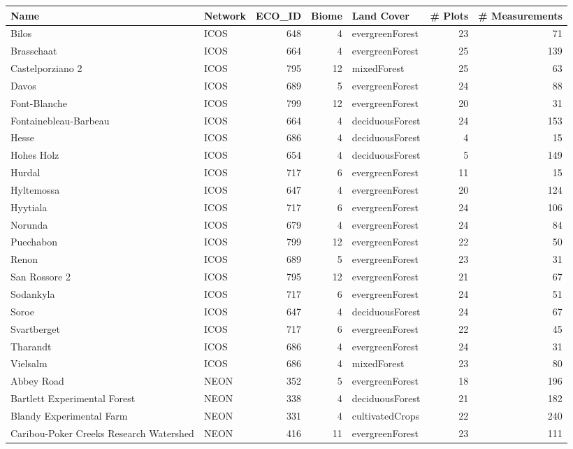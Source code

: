 \begin{tabular}{llrrlrr}
\toprule
Name & Network & ECO_ID & Biome & Land Cover & # Plots & # Measurements \\
\midrule
Bilos & ICOS & 648 & 4 & evergreenForest & 23 & 71 \\
Brasschaat & ICOS & 664 & 4 & evergreenForest & 25 & 139 \\
Castelporziano 2 & ICOS & 795 & 12 & mixedForest & 25 & 63 \\
Davos & ICOS & 689 & 5 & evergreenForest & 24 & 88 \\
Font-Blanche & ICOS & 799 & 12 & evergreenForest & 20 & 31 \\
Fontainebleau-Barbeau & ICOS & 664 & 4 & deciduousForest & 24 & 153 \\
Hesse & ICOS & 686 & 4 & deciduousForest & 4 & 15 \\
Hohes Holz & ICOS & 654 & 4 & deciduousForest & 5 & 149 \\
Hurdal & ICOS & 717 & 6 & evergreenForest & 11 & 15 \\
Hyltemossa & ICOS & 647 & 4 & evergreenForest & 20 & 124 \\
Hyytiala & ICOS & 717 & 6 & evergreenForest & 24 & 106 \\
Norunda & ICOS & 679 & 4 & evergreenForest & 24 & 84 \\
Puechabon & ICOS & 799 & 12 & evergreenForest & 22 & 50 \\
Renon & ICOS & 689 & 5 & evergreenForest & 23 & 31 \\
San Rossore 2 & ICOS & 795 & 12 & evergreenForest & 21 & 67 \\
Sodankyla & ICOS & 717 & 6 & evergreenForest & 24 & 51 \\
Soroe & ICOS & 647 & 4 & deciduousForest & 24 & 67 \\
Svartberget & ICOS & 717 & 6 & evergreenForest & 22 & 45 \\
Tharandt & ICOS & 686 & 4 & evergreenForest & 24 & 31 \\
Vielsalm & ICOS & 686 & 4 & mixedForest & 23 & 80 \\
Abbey Road & NEON & 352 & 5 & evergreenForest & 18 & 196 \\
Bartlett Experimental Forest & NEON & 338 & 4 & deciduousForest & 21 & 182 \\
Blandy Experimental Farm & NEON & 331 & 4 & cultivatedCrops & 22 & 240 \\
Caribou-Poker Creeks Research Watershed & NEON & 416 & 11 & evergreenForest & 23 & 111 \\

\end{tabular}
